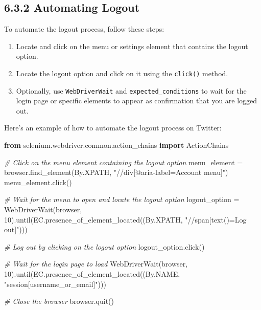 \documentclass[
  paper=a4,
  ,captions=tableheading
]{scrartcl}
\newenvironment{Shaded}{}{}
\newcommand{\CommentTok}[1]{\textcolor[rgb]{0.38,0.63,0.69}{\textit{#1}}}
\newcommand{\DecValTok}[1]{\textcolor[rgb]{0.25,0.63,0.44}{#1}}
\newcommand{\ImportTok}[1]{\textcolor[rgb]{0.00,0.50,0.00}{\textbf{#1}}}
\newcommand{\NormalTok}[1]{#1}
\newcommand{\OperatorTok}[1]{\textcolor[rgb]{0.40,0.40,0.40}{#1}}
\newcommand{\StringTok}[1]{\textcolor[rgb]{0.25,0.44,0.63}{#1}}
\providecommand{\tightlist}{%
  \setlength{\itemsep}{0pt}\setlength{\parskip}{0pt}}
\begin{document}
\hypertarget{automating-logout}{%
\subsection{6.3.2 Automating Logout}\label{automating-logout}}

To automate the logout process, follow these steps:

\begin{enumerate}
\def\labelenumi{\arabic{enumi}.}
\tightlist
\item
  Locate and click on the menu or settings element that contains the
  logout option.
\item
  Locate the logout option and click on it using the \texttt{click()}
  method.
\item
  Optionally, use \texttt{WebDriverWait} and
  \texttt{expected\_conditions} to wait for the login page or specific
  elements to appear as confirmation that you are logged out.
\end{enumerate}

Here's an example of how to automate the logout process on Twitter:

\begin{Shaded}
\begin{Highlighting}[]
\ImportTok{from}\NormalTok{ selenium.webdriver.common.action\_chains }\ImportTok{import}\NormalTok{ ActionChains}

\CommentTok{\# Click on the menu element containing the logout option}
\NormalTok{menu\_element }\OperatorTok{=}\NormalTok{ browser.find\_element(By.XPATH, }\StringTok{"//div[@aria{-}label=\textquotesingle{}Account menu\textquotesingle{}]"}\NormalTok{)}
\NormalTok{menu\_element.click()}

\CommentTok{\# Wait for the menu to open and locate the logout option}
\NormalTok{logout\_option }\OperatorTok{=}\NormalTok{ WebDriverWait(browser, }\DecValTok{10}\NormalTok{).until(EC.presence\_of\_element\_located((By.XPATH, }\StringTok{"//span[text()=\textquotesingle{}Log out\textquotesingle{}]"}\NormalTok{)))}

\CommentTok{\# Log out by clicking on the logout option}
\NormalTok{logout\_option.click()}

\CommentTok{\# Wait for the login page to load}
\NormalTok{WebDriverWait(browser, }\DecValTok{10}\NormalTok{).until(EC.presence\_of\_element\_located((By.NAME, }\StringTok{"session[username\_or\_email]"}\NormalTok{)))}

\CommentTok{\# Close the browser}
\NormalTok{browser.quit()}
\end{Highlighting}
\end{Shaded}
\end{document}

